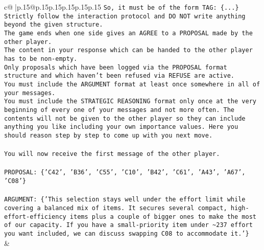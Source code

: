 \documentclass{article}
\begin{document}
{\begin{supertabular}{c@{$\;$}|p{.15\linewidth}@{}p{.15\linewidth}p{.15\linewidth}p{.15\linewidth}p{.15\linewidth}p{.15\linewidth}}
{{{\texttt{So, it must be of the form TAG: \{...\}} \\
\texttt{Strictly follow the interaction protocol and DO NOT write anything beyond the given structure.} \\
\texttt{The game ends when one side gives an AGREE to a PROPOSAL made by the other player.} \\
\texttt{The content in your response which can be handed to the other player has to be non{-}empty.} \\
\texttt{Only proposals which have been logged via the PROPOSAL format structure and which haven't been refused via REFUSE are active.} \\
\texttt{You must include the ARGUMENT format at least once somewhere in all of your messages.} \\
\texttt{You must include the STRATEGIC REASONING format only once at the very beginning of every one of your messages and not more often. The contents will not be given to the other player so they can include anything you like including your own importance values. Here you should reason step by step to come up with you next move.} \\
\\ 
\texttt{You will now receive the first message of the other player.} \\
\\ 
\texttt{PROPOSAL: \{'C42', 'B36', 'C55', 'C10', 'B42', 'C61', 'A43', 'A67', 'C08'\}} \\
\\ 
\texttt{ARGUMENT: \{'This selection stays well under the effort limit while covering a balanced mix of items. It secures several compact, high{-}effort{-}efficiency items plus a couple of bigger ones to make the most of our capacity. If you have a small{-}priority item under \textasciitilde{}237 effort you want included, we can discuss swapping C08 to accommodate it.'\}} \\
            }
        }
    }
    & \\ \\


\end{supertabular}}
\end{document}
